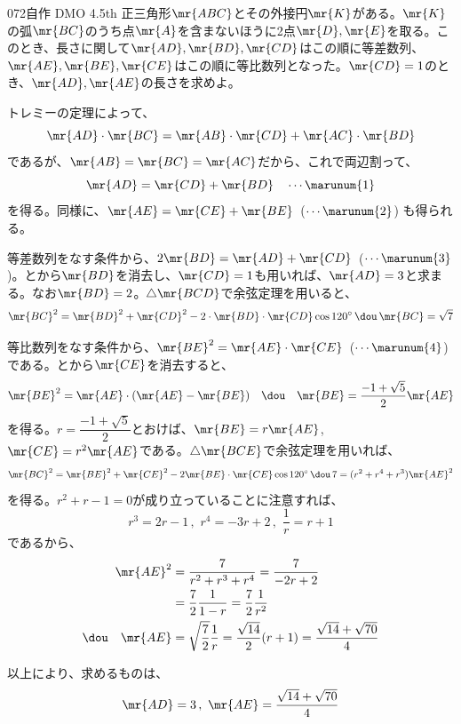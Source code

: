 \begin{prob}{072}{}{自作 DMO 4.5th}
 正三角形$\mr{ABC}$とその外接円$\mr{K}$がある。$\mr{K}$の弧$\mr{BC}$のうち点$\mr{A}$を含まないほうに2点$\mr{D}, \mr{E}$を取る。このとき、長さに関して$\mr{AD}, \mr{BD}, \mr{CD}$はこの順に等差数列、$\mr{AE}, \mr{BE}, \mr{CE}$はこの順に等比数列となった。$\mr{CD}=1$のとき、$\mr{AD}, \mr{AE}$の長さを求めよ。
\end{prob}
トレミーの定理によって、
\[ \mr{AD}\cdot\mr{BC}=\mr{AB}\cdot\mr{CD}+\mr{AC}\cdot\mr{BD} \]
であるが、$\mr{AB}=\mr{BC}=\mr{AC}$だから、これで両辺割って、
\[ \mr{AD}=\mr{CD}+\mr{BD} \quad\cdots \marunum{1} \]
を得る。同様に、$\mr{AE}=\mr{CE}+\mr{BE}$~($\cdots\marunum{2}$) も得られる。

等差数列をなす条件から、$2\mr{BD}=\mr{AD}+\mr{CD}$~($\cdots\marunum{3}$)。とから$\mr{BD}$を消去し、$\mr{CD}=1$も用いれば、$\mr{AD}=3$と求まる。なお$\mr{BD}=2$。$\triangle\mr{BCD}$で余弦定理を用いると、
\[ \mr{BC}^2=\mr{BD}^2+\mr{CD}^2-2\cdot\mr{BD}\cdot\mr{CD}\cos 120^\circ \,\dou\, \mr{BC}=\sqrt{7} \]

等比数列をなす条件から、$\mr{BE}^2=\mr{AE}\cdot\mr{CE}$~($\cdots\marunum{4}$) である。とから$\mr{CE}$を消去すると、
\[ \mr{BE}^2=\mr{AE}\cdot(\mr{AE}-\mr{BE}) \quad\dou\quad \mr{BE}=\frac{-1+\sqrt{5}}{2} \mr{AE} \]
を得る。$r=\dfrac{-1+\sqrt{5}}{2}$とおけば、$\mr{BE}=r\mr{AE}$, $\mr{CE}=r^2\mr{AE}$である。$\triangle\mr{BCE}$で余弦定理を用いれば、
\[ \mr{BC}^2=\mr{BE}^2+\mr{CE}^2-2\mr{BE}\cdot\mr{CE}\cos 120^\circ \,\dou\, 7=(r^2+r^4+r^3)\mr{AE}^2 \]
を得る。$r^2+r-1=0$が成り立っていることに注意すれば、
\[ r^3=2r-1 \,,\,\, r^4=-3r+2 \,,\,\, \frac{1}{r}=r+1 \]
であるから、
\begin{align*}
 \mr{AE}^2&=\frac{7}{r^2+r^3+r^4}=\frac{7}{-2r+2} \\
 &= \frac{7}{2}\frac{1}{1-r}=\frac{7}{2}\frac{1}{r^2} \\
 \dou\quad \mr{AE}&=\sqrt{\frac{7}{2}}\frac{1}{r} = \frac{\sqrt{14}}{2}(r+1) = \frac{\sqrt{14}+\sqrt{70}}{4}
\end{align*}

以上により、求めるものは、
\[ \mr{AD}=3 \,,\,\, \mr{AE}=\frac{\sqrt{14}+\sqrt{70}}{4} \] 